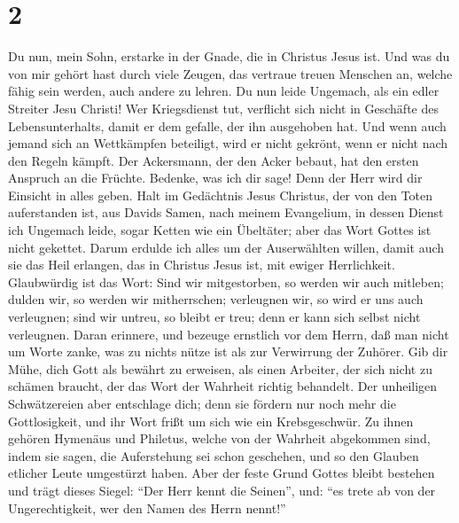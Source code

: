\hypertarget{section-1}{%
\section{2}\label{section-1}}

 Du nun, mein Sohn, erstarke in der Gnade, die in Christus
Jesus ist.  Und was du von mir gehört hast durch viele
Zeugen, das vertraue treuen Menschen an, welche fähig sein werden, auch
andere zu lehren.  Du nun leide Ungemach, als ein edler
Streiter Jesu Christi!  Wer Kriegsdienst tut, verflicht
sich nicht in Geschäfte des Lebensunterhalts, damit er dem gefalle, der
ihn ausgehoben hat.  Und wenn auch jemand sich an
Wettkämpfen beteiligt, wird er nicht gekrönt, wenn er nicht nach den
Regeln kämpft.  Der Ackersmann, der den Acker bebaut, hat
den ersten Anspruch an die Früchte.  Bedenke, was ich dir
sage! Denn der Herr wird dir Einsicht in alles geben. 
Halt im Gedächtnis Jesus Christus, der von den Toten auferstanden ist,
aus Davids Samen, nach meinem Evangelium,  in dessen
Dienst ich Ungemach leide, sogar Ketten wie ein Übeltäter; aber das Wort
Gottes ist nicht gekettet.  Darum erdulde ich alles um
der Auserwählten willen, damit auch sie das Heil erlangen, das in
Christus Jesus ist, mit ewiger Herrlichkeit.  Glaubwürdig
ist das Wort: Sind wir mitgestorben, so werden wir auch mitleben;
 dulden wir, so werden wir mitherrschen; verleugnen wir,
so wird er uns auch verleugnen;  sind wir untreu, so
bleibt er treu; denn er kann sich selbst nicht verleugnen.
 Daran erinnere, und bezeuge ernstlich vor dem Herrn, daß
man nicht um Worte zanke, was zu nichts nütze ist als zur Verwirrung der
Zuhörer.  Gib dir Mühe, dich Gott als bewährt zu
erweisen, als einen Arbeiter, der sich nicht zu schämen braucht, der das
Wort der Wahrheit richtig behandelt.  Der unheiligen
Schwätzereien aber entschlage dich; denn sie fördern nur noch mehr die
Gottlosigkeit,  und ihr Wort frißt um sich wie ein
Krebsgeschwür.  Zu ihnen gehören Hymenäus und Philetus,
welche von der Wahrheit abgekommen sind, indem sie sagen, die
Auferstehung sei schon geschehen, und so den Glauben etlicher Leute
umgestürzt haben.  Aber der feste Grund Gottes bleibt
bestehen und trägt dieses Siegel: ``Der Herr kennt die Seinen'', und:
``es trete ab von der Ungerechtigkeit, wer den Namen des Herrn nennt!''
